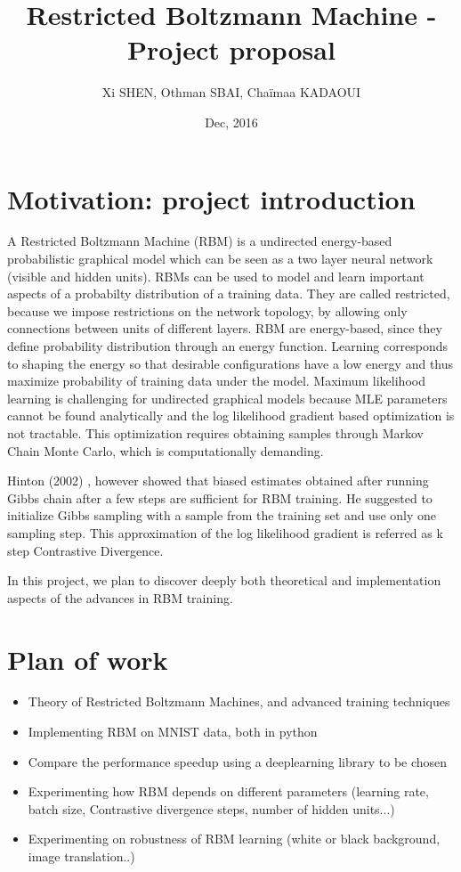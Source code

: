 \documentclass[a4paper,10pt]{article}
\author{Xi SHEN, Othman SBAI, Chaïmaa KADAOUI}
\title{Restricted Boltzmann Machine - Project proposal}
\date{Dec, 2016}
\begin{document}
\maketitle
\section{Motivation: project introduction}
A Restricted Boltzmann Machine (RBM) is a undirected energy-based probabilistic graphical model which can be seen as a two layer neural network (visible and hidden units). RBMs can be used to model and learn important aspects of a probabilty distribution of a training data. They are called restricted, because we impose restrictions on the network topology, by allowing only connections between units of different layers. RBM are energy-based, since they define probability distribution through an energy function. Learning corresponds to shaping the energy so that desirable configurations have a low energy and thus maximize probability of training data under the model. Maximum likelihood learning is challenging for undirected graphical models because MLE parameters cannot be found analytically and the log likelihood gradient based optimization is not tractable. This optimization requires obtaining samples through Markov Chain Monte Carlo, which is computationally demanding. 

Hinton (2002) \cite{praticalGuide}, however showed that biased estimates obtained after running Gibbs chain after a few steps are sufficient for RBM training. He suggested to initialize Gibbs sampling with a sample from the training set and use only one sampling step. This approximation of the log likelihood gradient is referred as k step Contrastive Divergence.

In this project, we plan to discover deeply both theoretical and implementation aspects of the advances in RBM training. 


\section{Plan of work}

\begin{itemize}
	\item Theory of Restricted Boltzmann Machines, and advanced training techniques
	\item Implementing RBM on MNIST data, both in python
	\item Compare the performance speedup using a deeplearning library to be chosen
	\item Experimenting how RBM depends on different parameters (learning rate, batch size, Contrastive divergence steps, number of hidden units...)
	\item Experimenting on robustness of RBM learning (white or black background, image translation..)
\end{itemize}
\end{document}
